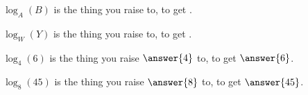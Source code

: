 \documentclass{ximera}
\author{Lee Wayand}
\begin{document}
\begin{exercise}







\begin{question}


$\log_A(B)$ is the thing you raise   to, to get .


\end{question}








\begin{question}


$\log_W(Y)$ is the thing you raise   to, to get .


\end{question}






\begin{question}


$\log_4(6)$ is the thing you raise $\answer{4}$ to, to get $\answer{6}$.


\end{question}






\begin{question}


$\log_8(45)$ is the thing you raise $\answer{8}$ to, to get $\answer{45}$.


\end{question}










\end{exercise}
\end{document}
